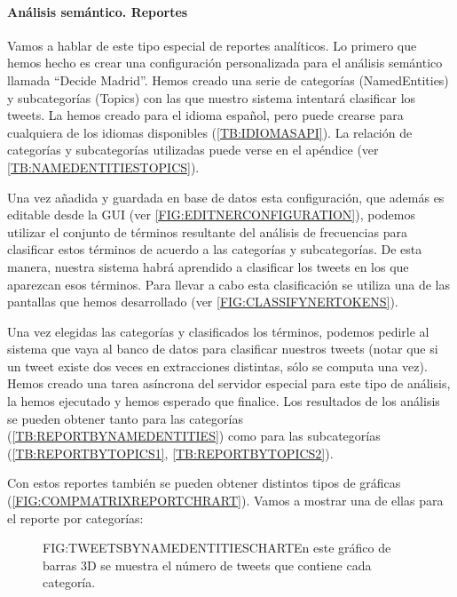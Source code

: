 \paragraph{Análisis semántico. Reportes}
Vamos a hablar de este tipo especial de reportes analíticos. Lo primero que hemos hecho es crear una configuración personalizada para el análisis semántico llamada ``Decide Madrid''. Hemos creado una serie de categorías (NamedEntities) y subcategorías (Topics) con las que nuestro sistema intentará clasificar los tweets. La hemos creado para el idioma español, pero puede crearse para cualquiera de los idiomas disponibles (\ref{TB:IDIOMASAPI}). La relación de categorías y subcategorías utilizadas puede verse en el apéndice (ver \ref{TB:NAMEDENTITIESTOPICS}).

Una vez añadida y guardada en base de datos esta configuración, que además es editable desde la GUI (ver \ref{FIG:EDITNERCONFIGURATION}), podemos utilizar el conjunto de términos resultante del análisis de frecuencias para clasificar estos términos de acuerdo a las categorías y subcategorías. De esta manera, nuestra sistema habrá aprendido a clasificar los tweets en los que aparezcan esos términos. Para llevar a cabo esta clasificación se utiliza una de las pantallas que hemos desarrollado (ver \ref{FIG:CLASSIFYNERTOKENS}).

Una vez elegidas las categorías y clasificados los términos, podemos pedirle al sistema que vaya al banco de datos para clasificar nuestros tweets (notar que si un tweet existe dos veces en extracciones distintas, sólo se computa una vez). Hemos creado una tarea asíncrona del servidor especial para este tipo de análisis, la hemos ejecutado y hemos esperado que finalice. Los resultados de los análisis se pueden obtener tanto para las categorías (\ref{TB:REPORTBYNAMEDENTITIES}) como para las subcategorías (\ref{TB:REPORTBYTOPICS1}, \ref{TB:REPORTBYTOPICS2}). 

Con estos reportes también se pueden obtener distintos tipos de gráficas (\ref{FIG:COMPMATRIXREPORTCHRART}). Vamos a mostrar una de ellas para el reporte por categorías:

 \begin{figure}[Gráfico de barras 3D que muestra los tweets por cateoría]{FIG:TWEETSBYNAMEDENTITIESCHART}{En este gráfico de barras 3D se muestra el número de tweets que contiene cada categoría.}
\end{figure}

